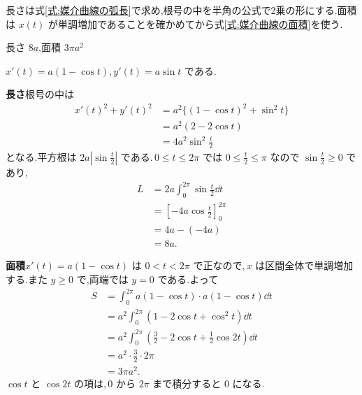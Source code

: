 長さは式\eqref{式:媒介曲線の弧長}で求め,根号の中を半角の公式で2乗の形にする.面積は $x(t)$ が単調増加であることを確かめてから式\eqref{式:媒介曲線の面積}を使う.

長さ $8a$,面積 $3\pi a^2$

$x'(t)=a(1-\cos t)$,\,$y'(t)=a\sin t$ である.

\textbf{長さ}\quad 根号の中は
\begin{align*}
x'(t)^2+y'(t)^2
 &=a^2\{(1-\cos t)^2+\sin^2t\}\\
 &=a^2(2-2\cos t)\\
 &=4a^2\sin^2\frac t2
\end{align*}
となる.平方根は $2a\left|\sin\frac t2\right|$ である.\,$0\le t\le2\pi$ では $0\le\frac t2\le\pi$ なので $\sin\frac t2\ge0$ であり,
\begin{align*}
L&=2a\int_0^{2\pi}\sin\frac t2\dd t\\
 &=\left[-4a\cos\frac t2\right]_0^{2\pi}\\
 &=4a-(-4a)\\
 &=8a.
\end{align*}

\textbf{面積}\quad $x'(t)=a(1-\cos t)$ は $0<t<2\pi$ で正なので,\,$x$ は区間全体で単調増加する.また $y\ge0$ で,両端では $y=0$ である.よって
\begin{align*}
S&=\int_0^{2\pi}a(1-\cos t)\cdot a(1-\cos t)\dd t\\
 &=a^2\int_0^{2\pi}(1-2\cos t+\cos^2t)\dd t\\
 &=a^2\int_0^{2\pi}\left(\frac32-2\cos t+\frac12\cos2t\right)\dd t\\
 &=a^2\cdot\frac32\cdot2\pi\\
 &=3\pi a^2.
\end{align*}
$\cos t$ と $\cos2t$ の項は,\,$0$ から $2\pi$ まで積分すると $0$ になる.
